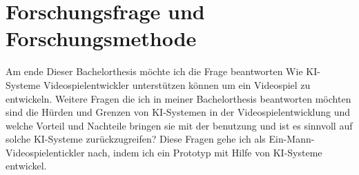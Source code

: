 \begin{comment}
Im Jahr 2022 hat die Firma OpenAI sein KI-Werkzeug ChatGPT der Öffentlichkeit zugänglich gemacht, und viele Berichte über einen Meilenstein in der KI-Forschung.
\\
ChatGPT kann selbständig durch eine für den Menschen einfache Prompt Schulaufgaben lösen oder sich mit dem Benutzer unterhalten.
\\
ChatGPT kann ganze Programme in verschiedenen Programmiersprachen Schreiben, was es davor nie in solchen Umfang da gewesen war.
\\
KI-Systeme bieten ein neues Gebiet um Forschung und Experimente zu betreiben, und ich möchte in meiner Bachelorthesis herausfinden ob es möglich ist, ein Videospiel mit hilfe von KI-Systemen zu entwickeln, so wie in der Pionierzeit wo einzelne Entwickler ganze Projekte erschaffen haben.
\\ 
Die Systeme, auf denen Videospiele liefen, wurden immer leistungsfähiger, und somit wurden auch lebendigere und komplexere Welten möglich. Videospiele wurden in der Regel nicht mehr von einer Person entwickelt, sondern von ganzen Studios. In diesen Studios werden Aufgaben auf Teams verteilt, wie zum Beispiel Concept Art and Design, Musik und Soundeffekte bis hin zum Vertrieb und Marketing.
\\
Kurz, ein Videospiel zu entwickeln ist schon sehr lange keine Ein-Mann-Aufgabe mehr, Und in solchen Teams kann jeder Videospielentwickler sich auf seine Stärken im Team konzentrieren.
\\
Ich sehe seit 2022 eine neue Möglichkeit Videospiele zu entwickeln, die zuvor in diesem Umfang nicht möglich gewesen war.
\\
KI-Systeme sind Werkzeuge, die ein hohes Potenzial beinhalten, um schnelles und qualitatives Arbeiten mit sich bringen.
\\
Mit Midjourney kann ich innerhalb von wenigen Minuten eine Landschaft erstellen lassen. ChatGPT kann dir Geschichten schreiben und Voice.ai dir eine neue Stimme verleihen. Das was die vorhin drei genannten KI-Systeme sich spezialisiert haben, sind in der realen
Welt, echte Berufe in der Gamingbranche - Concept Artist, narrative Designer / video game writer, voice actor.
\\
Es ist heute theoretisch möglich, ohne viele Vorkenntnisse diese Aufgaben mit Hilfe von KI-Systemen zu übernehmen.
Inhalt...
\end{comment}
\section{Forschungsfrage und Forschungsmethode}
Am ende Dieser Bachelorthesis möchte ich die Frage beantworten Wie KI-Systeme Videospielentwickler unterstützen können um ein Videospiel zu entwickeln.
Weitere Fragen die ich in meiner Bachelorthesis beantworten möchten sind die Hürden und Grenzen von KI-Systemen in der Videospielentwicklung und welche Vorteil und Nachteile bringen sie mit der benutzung und ist es sinnvoll auf solche KI-Systeme zurückzugreifen?
Diese Fragen gehe ich als Ein-Mann-Videospielentickler nach, indem ich ein Prototyp mit Hilfe von KI-Systeme entwickel.
